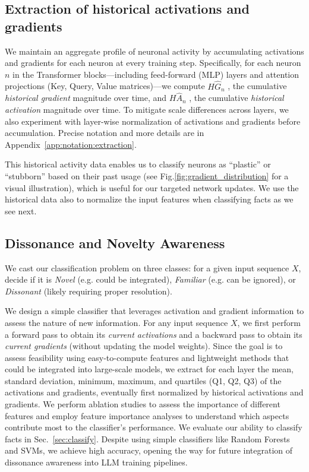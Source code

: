 \subsection{Extraction of historical activations and gradients}\label{sec:extraction} 
We maintain an aggregate profile of neuronal activity by accumulating activations and gradients for each neuron at every training step. Specifically, for each neuron $n$ in the Transformer blocks—including feed-forward (\textsc{MLP}) layers and attention projections (Key, Query, Value matrices)—we compute $H\hat{G}_n$ 
, the cumulative \textit{historical gradient} magnitude over time, and $H\hat{A}_n$ 
, the cumulative \textit{historical activation} magnitude over time. To mitigate scale differences across layers, we also experiment with layer-wise normalization of activations and gradients before accumulation. Precise notation and more details are in Appendix~\ref{app:notation:extraction}. 

This historical activity data enables us to classify neurons as ``plastic'' or ``stubborn'' based on their past usage (see Fig.\ref{fig:gradient_distribution} for a visual illustration), which is useful for our targeted network updates. We use the historical data also to normalize the input features when classifying facts as we see next.


\subsection{Dissonance and Novelty Awareness} 
We cast our classification problem on three classes: for a given input sequence \( X \), decide if it is \textit{Novel} (e.g. could be integrated), \textit{Familiar} (e.g. can be ignored), or \textit{Dissonant} (likely requiring proper resolution).

We design a simple classifier that leverages activation and gradient information to assess the nature of new information. 
For any input sequence \( X \), we first perform a forward pass to obtain its \textit{current activations} and a backward pass to obtain its \textit{current gradients} (without updating the model weights). 
Since the goal is to assess feasibility using easy-to-compute features and lightweight methods that could be integrated into large-scale models, we extract for each layer the mean, standard deviation, minimum, maximum, and quartiles (Q1, Q2, Q3) of the activations and gradients, eventually first normalized by historical activations and gradients. We perform ablation studies to assess the importance of different features and employ feature importance analyses to understand which aspects contribute most to the classifier's performance. We evaluate our ability to classify facts in Sec.~\ref{sec:classify}. Despite using simple classifiers like Random Forests and SVMs, we achieve high accuracy, opening the way for future integration of dissonance awareness into LLM training pipelines. 

